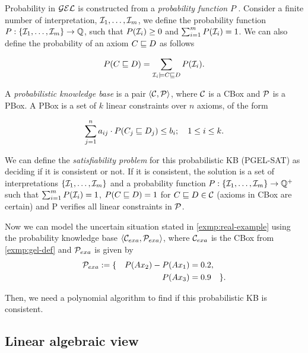 Probability in $\mathcal{GEL}$ is constructed from a \emph{probability function} $P$ \citep{Fin2020}. Consider a finite number of interpretation, $\mathcal{I}_1, \dots, \mathcal{I}_m$, we define the probability function $P: \{\mathcal{I}_1, \dots, \mathcal{I}_m\} \to \mathbb{Q}$, such that $P(\mathcal{I}_i) \geq 0$ and $\sum_{i = 1}^m P(\mathcal{I}_i) = 1$. We can also define the probability of an axiom $C \sqsubseteq D$ as follows

\[
	P(C \sqsubseteq D) = \sum_{\mathcal{I}_i \models C \sqsubseteq D} P(\mathcal{I}_i).
\]

A \emph{probabilistic knowledge base} is a pair $\langle\mathcal{C}, \mathcal{P}\rangle$, where $\mathcal{C}$ is a CBox and $\mathcal{P}$ is a PBox. A PBox is a set of $k$ linear constraints over $n$ axioms, of the form

\begin{equation}
	\label{eq:pbox-restric}
	\sum_{j = 1}^n a_{ij} \cdot P(C_j \sqsubseteq D_j) \leq b_i; \quad 1 \leq i \leq k.
\end{equation}

We can define the \emph{satisfiability problem} for this probabilistic KB (PGEL-SAT) as deciding if it is consistent or not. If it is consistent, the solution is a set of interpretations $\{\mathcal{I}_1, \dots, \mathcal{I}_m \}$ and a probability function $P: \{\mathcal{I}_1, \dots, \mathcal{I}_m \} \to \mathbb{Q}^+$ such that $\sum_{i = 1}^m P(\mathcal{I}_i) = 1$, $P(C \sqsubseteq D) = 1$ for $C \sqsubseteq D \in \mathcal{C}$ (axioms in CBox are certain) and P verifies all linear constraints in $\mathcal{P}$.
% 
\begin{example}
	Now we can model the uncertain situation stated in \autoref{exmp:real-example} using the probability knowledge base $\langle\mathcal{C}_{exa}, \mathcal{P}_{exa}\rangle$, where $\mathcal{C}_{exa}$ is the CBox from \autoref{exmp:gel-def} and $\mathcal{P}_{exa}$ is given by
	\begin{align*}
		\mathcal{P}_{exa} := \{ \quad P(Ax_2) - P(Ax_1) & = 0.2,           \\
		P(Ax_3)                                 & = 0.9  \quad \}.
	\end{align*}

	Then, we need a polynomial algorithm to find if this probabilistic KB is consistent.
\end{example}
% 
\subsection{Linear algebraic view}

